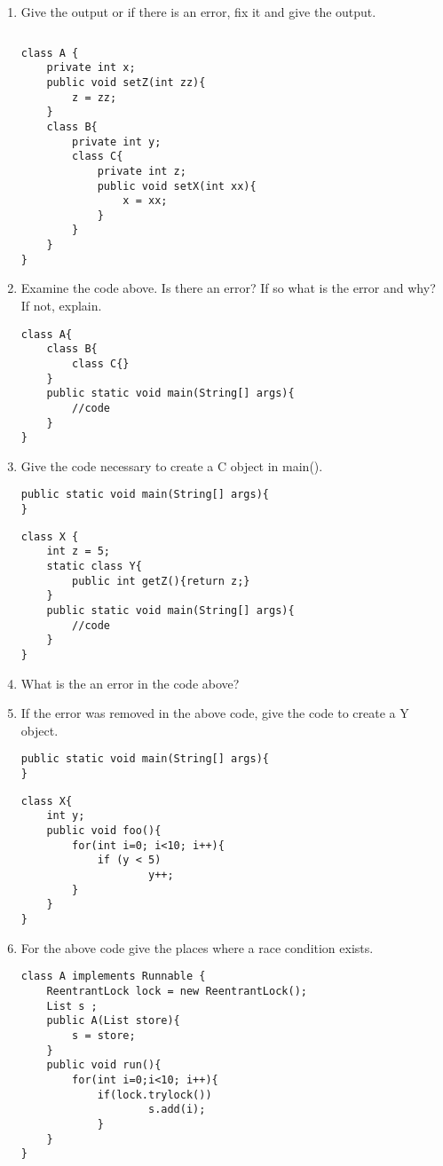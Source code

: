 \documentclass{article}
\begin{document}
\begin{enumerate}
	\item Give the output or if there is an error, fix it and give the output.
\begin{lstlisting}
\end{lstlisting}
\begin{lstlisting}
class A {
 	private int x;
 	public void setZ(int zz){
 		z = zz;
 	}
 	class B{
  		private int y;
  		class C{
   			private int z;
   			public void setX(int xx){
   				x = xx;
   			}
  		}
 	}
}
\end{lstlisting}
	\item Examine the code above. Is there an error? If so what is the error and why? If not, explain.\newline
\begin{lstlisting}
class A{
 	class B{
  		class C{}
 	}
	public static void main(String[] args){
 		//code
	}
}
\end{lstlisting}
	\item Give the code necessary to create a C object in main().
\begin{lstlisting}
public static void main(String[] args){
}
\end{lstlisting}
\begin{lstlisting}
class X {
 	int z = 5;
 	static class Y{
  		public int getZ(){return z;}
 	}
 	public static void main(String[] args){
 		//code
 	}
}
\end{lstlisting}
	\item What is the an error in the code above?\newline
	\item If the error was removed in the above code, give the  code to create a Y object.
\begin{lstlisting}
public static void main(String[] args){
}
\end{lstlisting}
	\newpage
\begin{lstlisting}
class X{
 	int y;
 	public void foo(){
  		for(int i=0; i<10; i++){
   			if (y < 5)
    				y++;
 		}
 	}
}
\end{lstlisting}
	\item For the above code give the places where a race condition exists.\newline
\begin{lstlisting}
class A implements Runnable {
 	ReentrantLock lock = new ReentrantLock();
 	List s ;
 	public A(List store){
 		s = store;
 	}
 	public void run(){
 		for(int i=0;i<10; i++){
   			if(lock.trylock())
    				s.add(i);
    		}
 	}
}


\end{lstlisting}
\end{enumerate}
\end{document}
